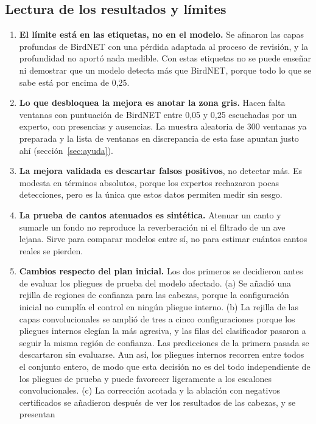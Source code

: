 \subsection{Lectura de los resultados y límites}\label{sec:lectura2}
\begin{enumerate}
  \item \textbf{El límite está en las etiquetas, no en el modelo.} Se afinaron las capas profundas de BirdNET con una pérdida adaptada al proceso de
        revisión, y la profundidad no aportó nada medible. Con estas etiquetas no se puede enseñar ni demostrar que un modelo detecta más que BirdNET, porque
        todo lo que se sabe está por encima de 0,25.
  \item \textbf{Lo que desbloquea la mejora es anotar la zona gris.} Hacen falta ventanas con puntuación de BirdNET entre 0,05 y 0,25 escuchadas por un
        experto, con presencias y ausencias. La muestra aleatoria de 300 ventanas ya preparada y la lista de ventanas en discrepancia de esta fase
        apuntan justo ahí (sección~\ref{sec:ayuda}).
  \item \textbf{La mejora validada es descartar falsos positivos}, no detectar más. Es modesta en términos absolutos, porque los expertos rechazaron pocas
        detecciones, pero es la única que estos datos permiten medir sin sesgo.
  \item \textbf{La prueba de cantos atenuados es sintética.} Atenuar un canto y sumarle un fondo no reproduce la reverberación ni el filtrado de un ave
        lejana. Sirve para comparar modelos entre sí, no para estimar cuántos cantos reales se pierden.
  \item \textbf{Cambios respecto del plan inicial.} Los dos primeros se decidieron antes de evaluar los pliegues de prueba del modelo afectado.
        (a) Se añadió una rejilla de regiones de confianza para las cabezas, porque la configuración inicial no cumplía el control en ningún pliegue interno.
        (b) La rejilla de las capas convolucionales se amplió de tres a cinco configuraciones porque los pliegues internos elegían la más agresiva, y las
        filas del clasificador pasaron a seguir la misma región de confianza. Las predicciones de la primera pasada se descartaron sin evaluarse. Aun así,
        los pliegues internos recorren entre todos el conjunto entero, de modo que esta decisión no es del todo independiente de los pliegues de prueba
        y puede favorecer ligeramente a los escalones convolucionales.
        (c) La corrección acotada y la ablación con negativos certificados se añadieron después de ver los resultados de las cabezas, y se presentan

\end{enumerate}
